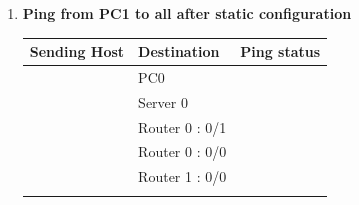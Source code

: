 \documentclass[a4paper,11pt]{article}
\begin{document}
\begin{enumerate}
\begin{enumerate}
              \item \textbf{Ping from PC1 to all after static configuration}
                    \begin{table}[H]
                        \centering
                        \begin{tabular}{| m{9em}| m{12em}| m{9em} |}
                            \hline
                            \textbf{Sending Host}                                           & \textbf{Destination} & \textbf{Ping status}                                                     \\
                            \hline
                            {\cellcolor[rgb]{0.333,0.686,1}}                                & PC0                  & {\cellcolor[rgb]{0.365,1,0.741}}                                         \\
                            \hhline{|>{\arrayrulecolor[rgb]{0.333,0.686,1}}->{\arrayrulecolor{black}}->{\arrayrulecolor[rgb]{0.365,1,0.741}}->{\arrayrulecolor{black}}|}
                            {\cellcolor[rgb]{0.333,0.686,1}}                                & Server 0             & {\cellcolor[rgb]{0.365,1,0.741}}                                         \\
                            \hhline{|>{\arrayrulecolor[rgb]{0.333,0.686,1}}->{\arrayrulecolor{black}}->{\arrayrulecolor[rgb]{0.365,1,0.741}}->{\arrayrulecolor{black}}|}
                            {\cellcolor[rgb]{0.333,0.686,1}}                                & Router 0 : 0/1       & {\cellcolor[rgb]{0.365,1,0.741}}                                         \\
                            \hhline{|>{\arrayrulecolor[rgb]{0.333,0.686,1}}->{\arrayrulecolor{black}}->{\arrayrulecolor[rgb]{0.365,1,0.741}}->{\arrayrulecolor{black}}|}
                            {\cellcolor[rgb]{0.333,0.686,1}}                                & Router 0 : 0/0       & {\cellcolor[rgb]{0.365,1,0.741}}                                         \\
                            \hhline{|>{\arrayrulecolor[rgb]{0.333,0.686,1}}->{\arrayrulecolor{black}}->{\arrayrulecolor[rgb]{0.365,1,0.741}}->{\arrayrulecolor{black}}|}
                            {\cellcolor[rgb]{0.333,0.686,1}}                                & Router 1 : 0/0       & {\cellcolor[rgb]{0.365,1,0.741}}                                         \\
                            \hhline{|>{\arrayrulecolor[rgb]{0.333,0.686,1}}->{\arrayrulecolor{black}}->{\arrayrulecolor[rgb]{0.365,1,0.741}}->{\arrayrulecolor{black}}|}

\end{tabular}
\end{table}
\end{enumerate}
\end{enumerate}
\end{document}
